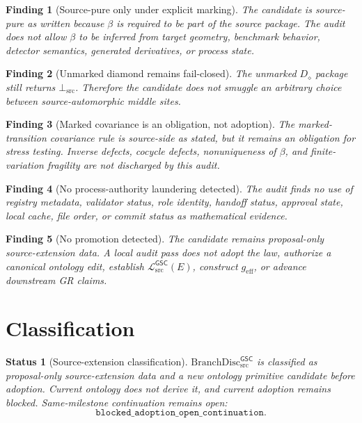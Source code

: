 \documentclass[11pt]{article}
\newcommand{\MetricData}{\mathcal{L}_{\mathrm{src}}^{\mathsf{GSC}}}
\newcommand{\BottomSrc}{\bot_{\mathrm{src}}}
\newcommand{\geff}{g_{\mathrm{eff}}}
\newcommand{\Diamond}{D_{\diamond}}
\newcommand{\BranchDisc}{\mathrm{BranchDisc}_{\mathrm{src}}^{\mathsf{GSC}}}
\newtheorem{finding}{Finding}
\newtheorem{status}{Status}
\begin{document}
\begin{finding}[Source-pure only under explicit marking]
The candidate is source-pure as written because \(\beta\) is required to be
part of the source package. The audit does not allow \(\beta\) to be inferred
from target geometry, benchmark behavior, detector semantics, generated
derivatives, or process state.
\end{finding}

\begin{finding}[Unmarked diamond remains fail-closed]
The unmarked \(\Diamond\) package still returns \(\BottomSrc\). Therefore the
candidate does not smuggle an arbitrary choice between source-automorphic
middle sites.
\end{finding}

\begin{finding}[Marked covariance is an obligation, not adoption]
The marked-transition covariance rule is source-side as stated, but it remains
an obligation for stress testing. Inverse defects, cocycle defects,
nonuniqueness of \(\beta\), and finite-variation fragility are not discharged
by this audit.
\end{finding}

\begin{finding}[No process-authority laundering detected]
The audit finds no use of registry metadata, validator status, role identity,
handoff status, approval state, local cache, file order, or commit status as
mathematical evidence.
\end{finding}

\begin{finding}[No promotion detected]
The candidate remains proposal-only source-extension data. A local audit pass
does not adopt the law, authorize a canonical ontology edit, establish
\(\MetricData(E)\), construct \(\geff\), or advance downstream GR claims.
\end{finding}

\section{Classification}

\begin{status}[Source-extension classification]
\(\BranchDisc\) is classified as proposal-only source-extension data and a
new ontology primitive candidate before adoption. Current ontology does not
derive it, and current adoption remains blocked. Same-milestone continuation
remains open:
\[
\texttt{blocked\_adoption\_open\_continuation}.
\]
\end{status}
\end{document}
